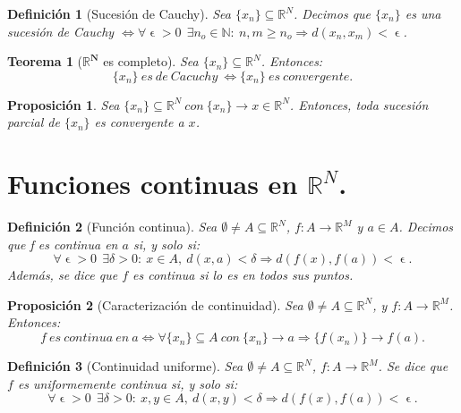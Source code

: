 \documentclass[11pt, a4paper, titlepage]{article}
\let\epsilon\upvarepsilon
\newcommand{\bm}[1]{\boldsymbol{#1}}
\theoremstyle{theorem-style}
\newtheorem*{nth}{Teorema}
\newtheorem*{nprop}{Proposición}
\theoremstyle{definition-style}
\newtheorem*{ndef}{Definición}
\theoremstyle{remark-style}
\theoremstyle{example-style}
\begin{document}
\begin{ndef}[Sucesión de Cauchy]
Sea $\{x_n\}\subseteq \mathbb{R}^N$. Decimos que $\{x_n\}$ es una \textit{sucesión de Cauchy} $\iff \forall \epsilon > 0\ \ \exists n_o \in \mathbb{N}: \ n,m\ge n_o \Rightarrow d(x_n,x_m) < \epsilon$.
\end{ndef}



\begin{nth} [$\bm{\mathbb{R}^N}$ es completo]
Sea $\{x_n\}\subseteq \mathbb{R}^N$. Entonces: $$\{x_n\}\ es\ de\ Cacuchy\ \iff \{x_n\}\ es\ convergente.$$
\end{nth}



\begin{nprop}
Sea $\{x_n\} \subseteq \mathbb{R}^N\ con\ \{x_n\} \rightarrow x \in \mathbb{R}^N$. Entonces, toda sucesión parcial de $\{x_n\}$ es convergente a $x$.
\end{nprop}

\newpage


\section{Funciones continuas en $\mathbb{R}^N$.}



\begin{ndef}[Función continua]
Sea $\emptyset \ne A\subseteq \mathbb{R}^N$, $f: A \longrightarrow \mathbb{R}^M$ y $a \in A$. Decimos que \textit{f es continua en $a$} si, y solo si: $$\forall \epsilon > 0\ \ \exists \delta > 0: \ x\in A, \ d(x,a)<\delta \Rightarrow d(f(x),f(a))<\epsilon.$$
Además, se dice que $f$ es continua si lo es en todos sus puntos.	
\end{ndef}



\begin{nprop}[Caracterización de continuidad]
Sea $\emptyset \ne A \subseteq \mathbb{R}^N$, y $f:A\longrightarrow \mathbb{R}^M$. Entonces: $$f\ es\ continua\ en\ a \iff \forall \{x_n\}\subseteq A\ con\ \{x_n\} \rightarrow a \Rightarrow \{f(x_n)\} \rightarrow f(a).$$
\end{nprop}



\begin{ndef}[Continuidad uniforme]
Sea $\emptyset \ne A \subseteq \mathbb{R}^N$, $f:A \longrightarrow \mathbb{R}^M$. Se dice que $f$ es uniformemente continua si, y solo si: $$\forall \epsilon > 0 \ \ \exists \delta > 0 : \ x,y \in A,\ d(x,y) < \delta \Rightarrow d(f(x),f(a)) < \epsilon.$$
\end{ndef}
\end{document}
